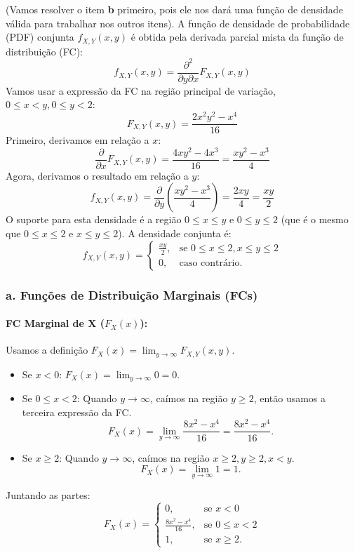 \documentclass[12pt]{article}
\begin{document}
(Vamos resolver o item \textbf{b} primeiro, pois ele nos dará uma função de densidade válida para trabalhar nos outros itens).
A função de densidade de probabilidade (PDF) conjunta $f_{X,Y}(x,y)$ é obtida pela derivada parcial mista da função de distribuição (FC):
\[ f_{X,Y}(x,y) = \frac{\partial^2}{\partial y \partial x} F_{X,Y}(x,y) \]
Vamos usar a expressão da FC na região principal de variação, $0 \le x < y, 0 \le y < 2$:
\[ F_{X,Y}(x,y) = \frac{2x^2y^2-x^4}{16} \]
Primeiro, derivamos em relação a $x$:
\[ \frac{\partial}{\partial x} F_{X,Y}(x,y) = \frac{4xy^2 - 4x^3}{16} = \frac{xy^2 - x^3}{4} \]
Agora, derivamos o resultado em relação a $y$:
\[ f_{X,Y}(x,y) = \frac{\partial}{\partial y} \left( \frac{xy^2 - x^3}{4} \right) = \frac{2xy}{4} = \frac{xy}{2} \]
O suporte para esta densidade é a região $0 \le x \le y$ e $0 \le y \le 2$ (que é o mesmo que $0 \le x \le 2$ e $x \le y \le 2$). A densidade conjunta é:
\[ f_{X,Y}(x,y) = \begin{cases} \frac{xy}{2}, & \text{se } 0 \le x \le 2, x \le y \le 2 \\ 0, & \text{caso contrário.} \end{cases} \]

\subsubsection*{a. Funções de Distribuição Marginais (FCs)}

\paragraph{FC Marginal de X ($F_X(x)$):}
Usamos a definição $F_X(x) = \lim_{y\to\infty} F_{X,Y}(x,y)$.
\begin{itemize}
    \item Se $x < 0$: $F_X(x) = \lim_{y\to\infty} 0 = 0$.
    \item Se $0 \le x < 2$: Quando $y \to \infty$, caímos na região $y \ge 2$, então usamos a terceira expressão da FC.
    \[ F_X(x) = \lim_{y\to\infty} \frac{8x^2-x^4}{16} = \frac{8x^2-x^4}{16}. \]
    \item Se $x \ge 2$: Quando $y \to \infty$, caímos na região $x \ge 2, y \ge 2, x < y$.
    \[ F_X(x) = \lim_{y\to\infty} 1 = 1. \]
\end{itemize}
Juntando as partes:
\[ F_X(x) = \begin{cases} 0, & \text{se } x < 0 \\ \frac{8x^2-x^4}{16}, & \text{se } 0 \le x < 2 \\ 1, & \text{se } x \ge 2. \end{cases} \]
\end{document}
